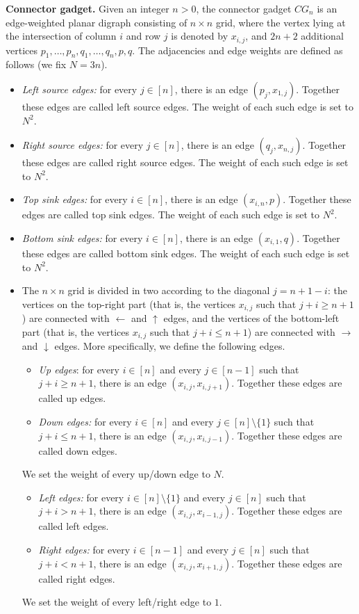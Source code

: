 \documentclass[a4paper,11pt]{article}
\theoremstyle{plain}
\newtheorem{identification rule}{Identification Rule}
\theoremstyle{definition}
\theoremstyle{remark}
\begin{document}
\noindent
\textbf{Connector gadget.} Given an integer $n > 0$, the connector gadget $CG_n$ is an edge-weighted planar digraph consisting of $n \times n$ grid, where the vertex lying at the intersection of column $i$ and row $j$ is denoted by $x_{i,j}$, and $2n+2$ additional vertices $p_1,\ldots,p_n,q_1,\ldots,q_n,p,q$. The adjacencies and edge weights are defined as follows (we fix $N = 3n$).
\begin{itemize}
\item \emph{Left source edges:} for every $j \in [n]$, there is an edge $(p_j,x_{1,j})$. Together these edges are called left source edges. The weight of each such edge is set to $N^2$.
\item \emph{Right source edges:} for every $j \in [n]$, there is an edge $(q_j,x_{n,j})$. Together these edges are called right source edges. The weight of each such edge is set to $N^2$.
\item \emph{Top sink edges:} for every $i \in [n]$, there is an edge $(x_{i,n},p)$. Together these edges are called top sink edges. The weight of each such edge is set to $N^2$.
\item \emph{Bottom sink edges:} for every $i \in [n]$, there is an edge $(x_{i,1},q)$. Together these edges are called bottom sink edges. The weight of each such edge is set to $N^2$.
\item The $n \times n$ grid is divided in two according to the diagonal $j = n+1-i$: the vertices on the top-right part (that is, the vertices $x_{i,j}$ such that $j+i \geq n+1$) are connected with $\leftarrow$ and $\uparrow$ edges, and the vertices of the bottom-left part (that is, the vertices $x_{i,j}$ such that $j+i \leq n+1$) are connected with $\rightarrow$ and $\downarrow$ edges. More specifically, we define the following edges.
\begin{itemize}
\item \emph{Up edges}: for every $i \in [n]$ and every $j \in [n-1]$ such that $j+i \geq n+1$, there is an edge $(x_{i,j},x_{i,j+1})$. Together these edges are called up edges.
\item \emph{Down edges:} for every $i \in [n]$ and every $j \in [n] \setminus \{1\}$ such that $j+i \leq n+1$, there is an edge $(x_{i,j},x_{i,j-1})$. Together these edges are called down edges.
\end{itemize}
We set the weight of every up/down edge to $N$.
\begin{itemize}
\item \emph{Left edges:} for every $i \in [n] \setminus \{1\}$ and every $j \in [n]$ such that $j+i > n+1$, there is an edge $(x_{i,j},x_{i-1,j})$. Together these edges are called left edges.
\item \emph{Right edges:} for every $i \in [n-1]$ and every $j \in [n]$ such that $j+i < n+1$, there is an edge $(x_{i,j},x_{i+1,j})$. Together these edges are called right edges.
\end{itemize}
We set the weight of every left/right edge to $1$.
\end{itemize}  
\end{document}

